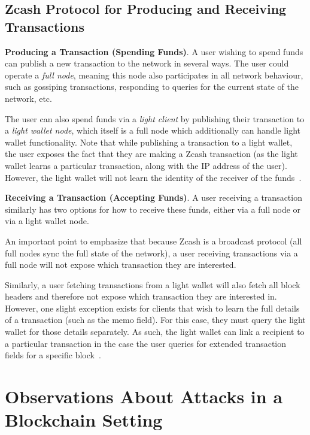 \documentclass{article}
\begin{document}
\subsection{Zcash Protocol for Producing and Receiving Transactions}

\textbf{Producing a Transaction (Spending Funds)}.
A user wishing to spend
funds can publish a new transaction to the network in several ways. The user
could operate a \emph{full node}, meaning this node also participates in all
network behaviour, such as gossiping transactions, responding to queries for
the current state of the network, etc.

The user can also spend funds via a \emph{light
client} by publishing their transaction to a
\emph{light wallet node}, which itself is a full node which additionally can handle
light wallet functionality. Note that while publishing a transaction to a light
wallet, the user exposes the fact that they are making a Zcash transaction (as
the light wallet learns a particular transaction, along with the IP address of
the user). However, the light wallet will not learn the identity of the
receiver of the funds~\cite{light-wallet-spec}.

\textbf{Receiving a Transaction (Accepting Funds)}. A user receiving a
transaction similarly has two options for how to receive these funds, either
via a full node or via a light wallet node.

An important point to emphasize that because Zcash is a broadcast protocol (all
full nodes sync the full state of the network), a user receiving transactions
via a full node will not expose which transaction they are interested.

Similarly, a user fetching transactions from a light wallet will also fetch all
block headers and therefore not expose which transaction they are interested
in. However, one slight exception exists for clients that wish
to learn the full details of a transaction (such as the memo field). For this
case,
they must query the light wallet for those details separately. As such, the
light wallet can link a recipient to a particular transaction in the case the
user queries for extended transaction fields for a specific block~\cite{light-wallet-spec}.

\section{Observations About Attacks in a Blockchain Setting}
\label{observations}
\end{document}
